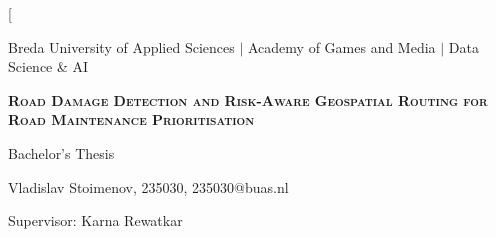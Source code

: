 \documentclass[10pt,a4paper,twocolumn]{article}
\begin{document}
\twocolumn[
  \begin{@twocolumnfalse}
  \begin{center}
    {\small\color{guidegray}
      Breda University of Applied Sciences \hspace{1em}$\mid$\hspace{1em}
      Academy of Games and Media \hspace{1em}$\mid$\hspace{1em}
      Data Science \& AI}
    \vspace{12pt}

    {\fontsize{16}{19}\bfseries\scshape
      Road Damage Detection and Risk-Aware Geospatial Routing for Road
      Maintenance Prioritisation
    \par}
    \vspace{3pt}

    {\normalsize Bachelor's Thesis}
    \vspace{6pt}

    {\normalsize
      Vladislav Stoimenov, 235030, 235030@buas.nl}
    \vspace{2pt}

    {\normalsize
      Supervisor: Karna Rewatkar}
    \vspace{12pt}

    \begin{minipage}{0.92\textwidth}
      \small
      \setlength{\parindent}{6mm}


\end{minipage}
\end{center}
\end{@twocolumnfalse}
\end{document}
